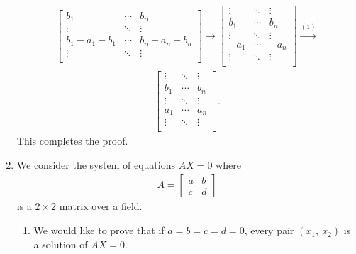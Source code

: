 \documentclass[12pt]{article}
\begin{document}
\begin{enumerate}
\begin{align*}
\begin{bmatrix}
          b_1 & \cdots & b_n \\
          \vdots   & \ddots & \vdots\\
          b_1 - a_1 - b_1 & \cdots & b_n - a_n - b_n\\
          \vdots   & \ddots & \vdots\\
        \end{bmatrix}
        \xrightarrow{}
        \begin{bmatrix}
          \vdots   & \ddots & \vdots\\
          b_1 & \cdots & b_n \\
          \vdots   & \ddots & \vdots\\
          - a_1 & \cdots & - a_n \\
          \vdots   & \ddots & \vdots\\
        \end{bmatrix}
        \xrightarrow{(1)}
      \end{align*}
      \begin{align*}
        \begin{bmatrix}
          \vdots   & \ddots & \vdots\\
          b_1 & \cdots & b_n \\
          \vdots   & \ddots & \vdots\\
          a_1 & \cdots & a_n \\
          \vdots   & \ddots & \vdots\\
        \end{bmatrix}.
      \end{align*}
    This completes the proof.

  \item
    We consider the system of equations $AX = 0$ where
    \begin{align*}
      A =
      \begin{bmatrix}
         a & b\\
         c & d
      \end{bmatrix}
    \end{align*}
    is a $2 \times 2$ matrix over a field.
    \begin{enumerate}
        \item
          We would like to prove that if $a = b = c = d = 0$,
          every pair $(x_1,\ x_2)$ is a solution of $AX = 0$.


\end{enumerate}
\end{enumerate}
\end{document}
